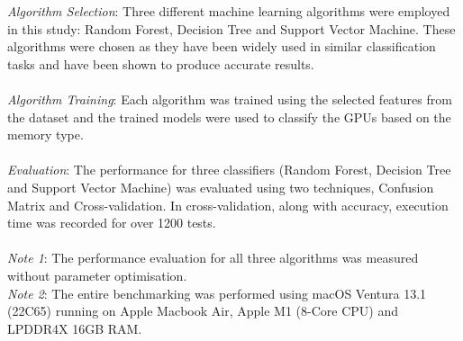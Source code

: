 \documentclass[conference]{IEEEtran}
\begin{document}
	\noindent \textit{Algorithm Selection}: Three different machine learning algorithms were employed in this study: Random Forest, Decision Tree and Support Vector Machine. These algorithms were chosen as they have been widely used in similar classification tasks and have been shown to produce accurate results.\\\\
	\textit{Algorithm Training}: Each algorithm was trained using the selected features from the dataset and the trained models were used to classify the GPUs based on the memory type.\\\\
	\textit{Evaluation}: The performance for three classifiers (Random Forest, Decision Tree and Support Vector Machine) was evaluated using two techniques, Confusion Matrix and Cross-validation. In cross-validation, along with accuracy, execution time was recorded for over 1200 tests.\\\\
	\textit{Note 1}: The performance evaluation for all three algorithms was measured without parameter optimisation.\\
	\textit{Note 2}: The entire benchmarking was performed using macOS Ventura 13.1 (22C65) running on Apple Macbook Air, Apple M1 (8-Core CPU) and LPDDR4X 16GB RAM.\\
\end{document}

